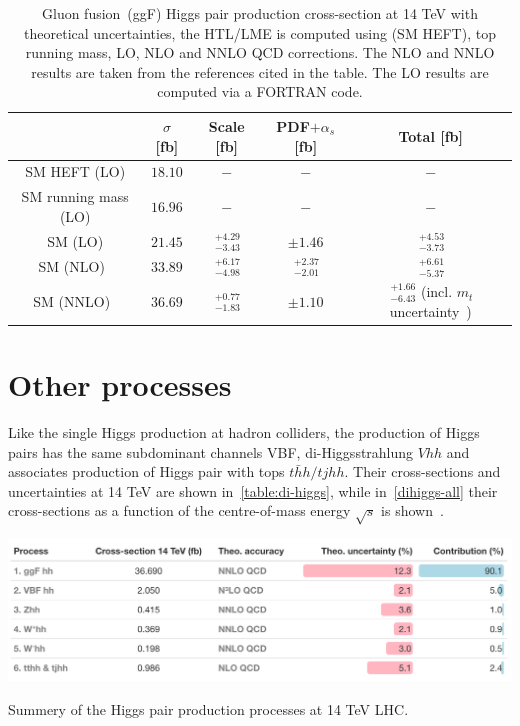 \begin{table}
	\centering
	\begin{tabular}{ccccc}
		\toprule
		& $ \sigma$	[fb] & Scale [fb] & PDF$+\alpha_s$ [fb]& Total [fb] \\
		\midrule
		SM HEFT  (LO)      &  $ 18.10$    &   $-$      & $-$   &  $-$ \\
		SM   running mass (LO)  &  $ 16.96$    &   $ -$   & $-$   &  $-$ \\
		SM    (LO)  &  $ 21.45$    &   $ \,^{+4.29}_{-3.43}$   & $\pm 1.46$   &  $ \,^{+4.53}_{-3.73}$ \\
		SM   (NLO)~\cite{Baglio:2012np}  &  $ 33.89$   &   $ \,^{+6.17}_{-4.98}$   & $ \,^{+2.37}_{-2.01}$   &  $ \,^{+6.61}_{-5.37}$ \\
		SM   (NNLO)~\cite{Grazzini:2018bsd}  &  $36.69$    &    $ \,^{+0.77}_{-1.83}$   & $\pm 1.10$   &  $ \,^{+1.66}_{-6.43}$ {\tiny(incl. $m_t$ uncertainty~\cite{Baglio:2020wgt})} \\
		\bottomrule
	\end{tabular}
	\caption{Gluon fusion~(ggF) Higgs pair production cross-section at 14 TeV with theoretical  uncertainties, the HTL/LME is computed using (SM HEFT), top running mass, LO, NLO and NNLO QCD corrections. The NLO and NNLO results are taken from the references cited in the table. The LO results are computed via a FORTRAN code.}
		\label{ggf_xsres}
\end{table}

\section{Other processes\label{otherhh}  }
Like the single Higgs production at hadron colliders, the production of Higgs pairs has the same subdominant channels VBF, di-Higgsstrahlung $ Vhh$ and associates production of Higgs pair with tops $t\bar hh /t j hh$. Their cross-sections and uncertainties at 14 TeV are shown in~\autoref{table:di-higgs}, while in~\autoref{dihiggs-all} their cross-sections as a function of the centre-of-mass energy $\sqrt{s}$ is shown~\cite{DiMicco:2019ngk}. 
\begin{table}[htbp!]
	\includegraphics[width=1\textwidth]{hh-table}
	\caption{ Summery of the Higgs pair production processes at 14 TeV LHC. \label{table:di-higgs} }
\end{table}
